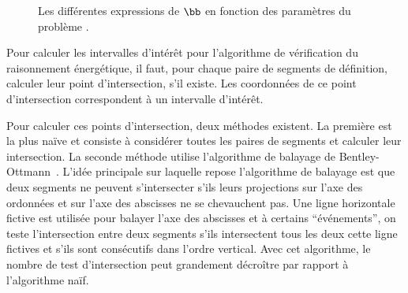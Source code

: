 \begin{figure}[!htb]
{
  }
  \caption{Les différentes expressions de $\bb$ en fonction des
    paramètres du problème \CECSP.}
  \label{fig:breakline_res}
\end{figure}

Pour calculer les intervalles d'intérêt pour l'algorithme de
vérification du raisonnement énergétique, il faut, pour chaque paire
de segments de définition, calculer leur point d'intersection, s'il
existe. Les coordonnées de ce point d'intersection correspondent à un
intervalle d'intérêt. 

Pour calculer ces points d'intersection, deux méthodes existent. La
première est la plus naïve et consiste à considérer toutes les paires
de segments et calculer leur intersection. La seconde méthode utilise
l'algorithme de balayage de Bentley-Ottmann~\cite{sweep}.  L'idée
principale sur laquelle repose l'algorithme de balayage est que deux
segments ne peuvent s'intersecter s'ils leurs projections sur l'axe
des ordonnées et sur l'axe des abscisses ne se chevauchent pas. Une
ligne horizontale fictive est utilisée pour balayer l'axe des
abscisses et à certains ``événements'', on teste l'intersection entre
deux segments s'ils intersectent tous les deux cette ligne fictives et
s'ils sont consécutifs dans l'ordre vertical. Avec cet algorithme, le
nombre de test d'intersection peut grandement décroître par rapport à
l'algorithme naïf.

